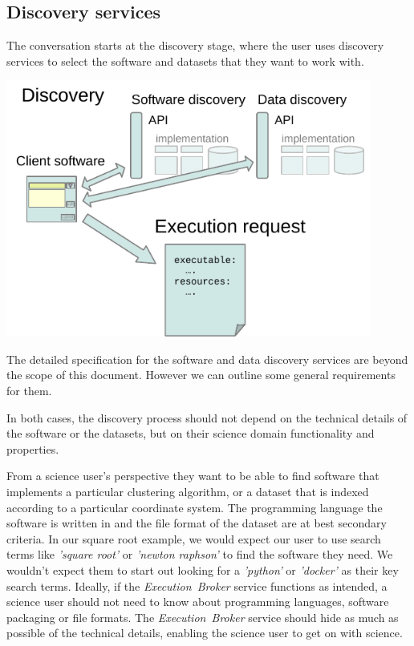 \documentclass[11pt,a4paper]{ivoa}
\newcommand{\executionbroker} {\textit{Execution~Broker}}
\newcommand{\dataset}[1] {dataset#1}
\begin{document}
\subsection{Discovery services}
\label{discovery-services}

The conversation starts at the discovery stage, where the user uses discovery services to
select the software and \dataset{s} that they want to work with.

\includegraphics[width=0.9\textwidth]{diagrams/data-discovery.pdf}

The detailed specification for the software and data discovery services are beyond the
scope of this document. However we can outline some general requirements for them.

In both cases, the discovery process should not depend on the technical details
of the software or the \dataset{s}, but on their science domain functionality and properties.

From a science user's perspective they want to be able to find software that implements
a particular clustering algorithm, or a \dataset{} that is indexed according to a particular
coordinate system.
The programming language the software is written in and the file format of the \dataset{}
are at best secondary criteria.
In our square root example, we would expect our user to use search terms like \textit{'square root'}
or \textit{'newton raphson'} to find the software they need.
We wouldn't expect them to start out looking for a \textit{'python'} or \textit{'docker'} as their key search terms.
Ideally, if the \executionbroker{} service functions as intended, a science user should not
need to know about programming languages, software packaging or file formats.
The \executionbroker{} service should hide as much as possible of the technical details,
enabling the science user to get on with science.
\end{document}
